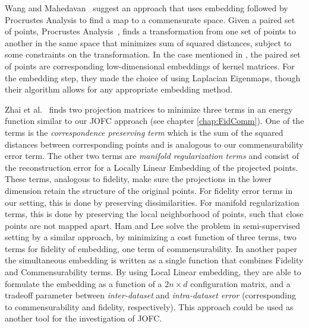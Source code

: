 \documentclass[12pt,oneside,final]{thesis}\usepackage[]{graphicx}\usepackage[]{color}
\begin{document}
Wang and Mahedavan~\cite{Wang2008} suggest an  approach that uses embedding followed by Procrustes Analysis to find a map to a commensurate space. Given a paired set of points, Procrustes Analysis~\cite{Sibson}, finds a transformation from one set of points to another in the same space that minimizes sum of squared distances, subject to some constraints on the transformation. In the case mentioned in \cite{Wang2008}, the paired set of points are corresponding low-dimensional embeddings of kernel matrices.   For the embedding step, they made the choice of using Laplacian Eigenmaps, though their algorithm allows for any appropriate embedding method.

 Zhai et al.~\cite{Zhai2010}  finds two projection matrices to minimize three terms in an energy function similar to our JOFC approach (see chapter \ref{chap:FidComm}). One of the terms is the \emph{correspondence preserving term} which is the sum of the squared distances between corresponding points and is analogous to our commensurability error term. The other two terms are \emph{manifold regularization terms} and consist of the reconstruction error for a Locally Linear Embedding of the projected points. These terms, analogous to fidelity, make sure the projections in the lower dimension retain the structure of the original points. For fidelity error terms in our setting, this is done by preserving dissimilarities. For manifold regularization terms, this is done by preserving the local neighborhood of points, such that close points are not mapped apart.
Ham and Lee\cite{HamLee2005a} solve the problem in semi-supervised setting by a similar approach, by minimizing a cost function of three terms, two terms for fidelity of embedding, one term of commensurability.
In another paper  the simultaneous embedding is written  as a single function  that combines Fidelity and Commensurability terms. By using Local Linear embedding,  they are able to formulate the embedding as a function of a $2n \times d$ configuration matrix, and a tradeoff parameter between \emph{inter-dataset} and \emph{intra-dataset error} (corresponding to commensurability and fidelity, respectively). This approach could be used as another tool for the investigation of JOFC.
\end{document}

